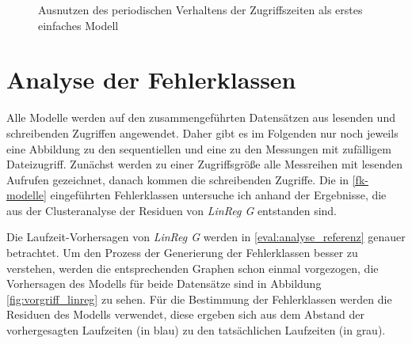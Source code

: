 \documentclass[
	12pt,
	a4paper,
	BCOR10mm,
	DIV14,
	listof=totoc,
	bibliography=totoc,
	headsepline
]{scrreprt}
\begin{document}
\begin{figure}
	\begin{center}
		\caption{Ausnutzen des periodischen Verhaltens der Zugriffszeiten als erstes einfaches Modell}
		\label{fig:periodicity100001}
	\end{center}
\end{figure} 
\clearpage

\section{Analyse der Fehlerklassen}
\label{eval:fk_analyse}
Alle Modelle werden auf den zusammengeführten Datensätzen aus lesenden und schreibenden Zugriffen angewendet. Daher gibt es im Folgenden nur noch jeweils eine Abbildung zu den sequentiellen und eine zu den Messungen mit zufälligem Dateizugriff.
Zunächst werden zu einer Zugriffsgröße alle Messreihen mit lesenden Aufrufen gezeichnet, danach kommen die schreibenden Zugriffe. 
Die in \ref{fk-modelle} eingeführten Fehlerklassen untersuche ich anhand der Ergebnisse, die aus der Clusteranalyse der Residuen von \textit{LinReg G} entstanden sind.\medskip

Die Laufzeit-Vorhersagen von \textit{LinReg G} werden in \ref{eval:analyse_referenz} genauer betrachtet.
Um den Prozess der Generierung der Fehlerklassen besser zu verstehen, werden die entsprechenden Graphen schon einmal vorgezogen, die Vorhersagen des Modells für beide Datensätze sind in Abbildung \ref{fig:vorgriff_linreg} zu sehen.
Für die Bestimmung der Fehlerklassen werden die Residuen des Modells verwendet, diese ergeben sich aus dem Abstand der vorhergesagten Laufzeiten (in blau) zu den tatsächlichen Laufzeiten (in grau). 
\end{document}
